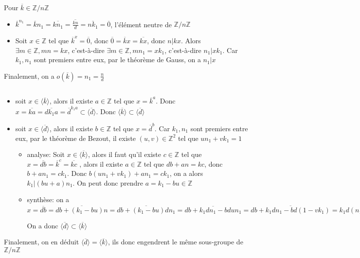 \documentclass[a4paper,12pt]{book}
\begin{document}
Pour $\overline{k} \in \mathbb{Z}/n\mathbb{Z}$
\begin{itemize}
    \item $\overline{k}^{n_1}=\overline{k}n_1=\overline{kn_1}=\overline{\frac{kn}{d}}=\overline{nk_1}=\overline{0}$, l'élément neutre de $\mathbb{Z}/n\mathbb{Z}$
    \item Soit $x\in \mathbb{Z}$ tel que $\overline{k}^{x}=\overline{0}$, donc $\overline{0}=\overline{k}x=\overline{kx}$, donc $n|kx$. Alors $\exists m \in \mathbb{Z}, mn=kx$, 
    c'est-à-dire $\exists m \in \mathbb{Z}, mn_1=xk_1$, c'est-à-dire $n_1|xk_1$. Car $k_1, n_1$ sont premiers entre eux, par le théorème de Gauss, on a $n_1|x$
\end{itemize}
Finalement, on a $\boxed{o(\overline{k})=n_1=\frac{n}{d}}$
\subsection{}
\begin{itemize}
    \item soit $x \in \langle \overline{k}\rangle$, alors il existe $a \in \mathbb{Z}$ tel que $x=\overline{k}^a$. Donc $x=\overline{ka}=\overline{dk_1a}=\overline{d}^{k_1a}\subset \langle \overline{d}\rangle$. 
    Donc $\langle \overline{k}\rangle \subset \langle \overline{d}\rangle$

    \item soit $x \in \langle \overline{d}\rangle$, alors il existe $b \in \mathbb{Z}$ tel que $x=\overline{d}^b$.
    Car $k_1, n_1$ sont premiers entre eux, par le théorème de Bezout, il existe $(u,v) \in \mathbb{Z}^2$ tel que $un_1+vk_1=1$
    \begin{itemize}
        \item analyse: Soit $x \in \langle \overline{k}\rangle$, alors il faut qu'il existe $c \in \mathbb{Z}$ tel que $x=\overline{db}=\overline{k}^c=\overline{kc}$
        , alors il existe $a \in \mathbb{Z}$ tel que $db+an=kc$, donc $b+an_1=ck_1$. Donc $b(un_1+vk_1)+an_1=ck_1$, on a alors $k_1|(bu+a)n_1$. On peut donc prendre $a=k_1-bu \in \mathbb{Z}$
        \item synthèse: on a $x=\overline{db}=\overline{db+(k_1-bu)n}=\overline{db+(k_1-bu)dn_1}=\overline{db+k_1dn_1-bdun_1}=\overline{db+k_1dn_1-bd(1-vk_1)}=\overline{k_1d(n_1+bv)}=\overline{k(n_1+bv)}=\overline{k}^{n_1+bv}\subset \langle \overline{k}\rangle$
        
        On a donc $\langle \overline{d}\rangle \subset \langle \overline{k}\rangle$
    \end{itemize}
\end{itemize}
Finalement, on en déduit $\boxed{\langle \overline{d}\rangle=\langle \overline{k}\rangle}$, ils donc engendrent le même sous-groupe de $\mathbb{Z}/n\mathbb{Z}$
\end{document}
